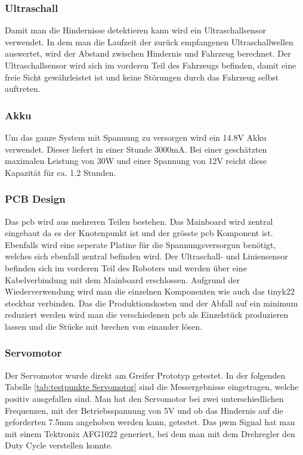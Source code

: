 \subsubsection*{Ultraschall}


Damit man die Hindernisse detektieren kann wird ein Ultraschallsensor verwendet. In dem man die Laufzeit der zurück empfangenen Ultraschallwellen auswertet, wird der Abstand zwischen Hindernis und Fahrzeug berechnet. Der Ultraschallsensor wird sich im vorderen Teil des Fahrzeugs befinden, damit eine freie Sicht gewährleistet ist und keine Störungen durch das Fahrzeug selbst auftreten.

\subsubsection*{Akku}


Um das ganze System mit Spannung zu versorgen wird ein 14.8V Akku verwendet. Dieser liefert in einer Stunde 3000mA. Bei einer geschätzten maximalen Leistung von 30W und einer Spannung von 12V reicht diese Kapazität für ca. 1.2 Stunden. 

\subsubsection*{PCB Design}


Das \acrshort{pcb} wird aus mehreren Teilen bestehen. Das Mainboard wird zentral eingebaut da es der Knotenpunkt ist und der grösste \acrshort{pcb} Komponent ist. Ebenfalls wird eine seperate Platine für die Spannungsversorgun benötigt, welches sich ebenfall zentral befinden wird. Der Ultraschall- und Liniensensor befinden sich im vorderen Teil des Roboters und werden über eine Kabelverbindung mit dem Mainboard erschlossen. Aufgrund der Wiederverwendung wird man die einzelnen Komponenten wie auch das \gls{tinyk22} steckbar verbinden. Das die Produktionskosten und der Abfall auf ein minimum reduziert werden wird man die verschiedenen \acrshort{pcb} als Einzelstück produzieren lassen und die Stücke mit brechen von einander lösen.

\subsubsection*{Servomotor}


Der Servomotor wurde direkt am Greifer Prototyp getestet. In der folgenden Tabelle \ref{tab:testpunkte Servomotor} sind die Messergebnisse eingetragen, welche positiv ausgefallen sind. Man hat den Servomotor bei zwei unterschiedlichen Frequenzen, mit der Betriebsspannung von 5V und ob das Hindernis auf die geforderten 7.5mm angehoben werden kann, getestet. Das \acrshort{pwm} Signal hat man mit einem Tektronix AFG1022 generiert, bei dem man mit dem Drehregler den Duty Cycle verstellen konnte.

